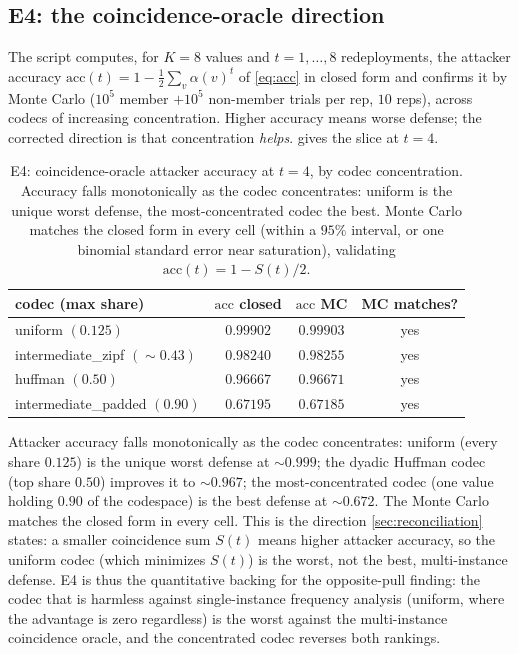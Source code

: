 \documentclass[11pt]{article}
\theoremstyle{definition}
\theoremstyle{plain}
\theoremstyle{remark}
\newcommand{\al}{\alpha}                    %
\begin{document}
\subsection{E4: the coincidence-oracle direction}

The script computes, for $K = 8$ values and $t = 1, \dots, 8$ redeployments, the attacker
accuracy $\mathrm{acc}(t) = 1 - \tfrac12 \sum_v \al(v)^t$ of \eqref{eq:acc} in closed form
and confirms it by Monte Carlo ($10^5$ member $+ 10^5$ non-member trials per rep, $10$
reps), across codecs of increasing concentration. Higher accuracy means worse defense; the
corrected direction is that concentration \emph{helps}.  gives the slice at
$t = 4$.

\begin{table}[t]
  \centering
  \caption{E4: coincidence-oracle attacker accuracy at $t = 4$, by codec concentration.
  Accuracy falls monotonically as the codec concentrates: uniform is the unique worst
  defense, the most-concentrated codec the best. Monte Carlo matches the closed form in
  every cell (within a $95\%$ interval, or one binomial standard error near saturation),
  validating $\mathrm{acc}(t) = 1 - S(t)/2$.}
  \label{tab:e4}
  \begin{tabular}{lccc}
    \toprule
    codec (max share) & $\mathrm{acc}$ closed & $\mathrm{acc}$ MC & MC matches? \\
    \midrule
    uniform $(0.125)$              & $0.99902$ & $0.99903$ & yes \\
    intermediate\_zipf $(\sim 0.43)$ & $0.98240$ & $0.98255$ & yes \\
    huffman $(0.50)$              & $0.96667$ & $0.96671$ & yes \\
    intermediate\_padded $(0.90)$ & $0.67195$ & $0.67185$ & yes \\
    \bottomrule
  \end{tabular}
\end{table}

Attacker accuracy falls monotonically as the codec concentrates: uniform (every share
$0.125$) is the unique worst defense at $\sim 0.999$; the dyadic Huffman codec (top share
$0.50$) improves it to $\sim 0.967$; the most-concentrated codec (one value holding $0.90$
of the codespace) is the best defense at $\sim 0.672$. The Monte Carlo matches the closed
form in every cell. This is the direction \cref{sec:reconciliation} states: a smaller
coincidence sum $S(t)$ means higher attacker accuracy, so the uniform codec (which
minimizes $S(t)$) is the worst, not the best, multi-instance defense. E4 is thus the
quantitative backing for the opposite-pull finding: the codec that is harmless against
single-instance frequency analysis (uniform, where the advantage is zero regardless) is the
worst against the multi-instance coincidence oracle, and the concentrated codec reverses
both rankings.
\end{document}
